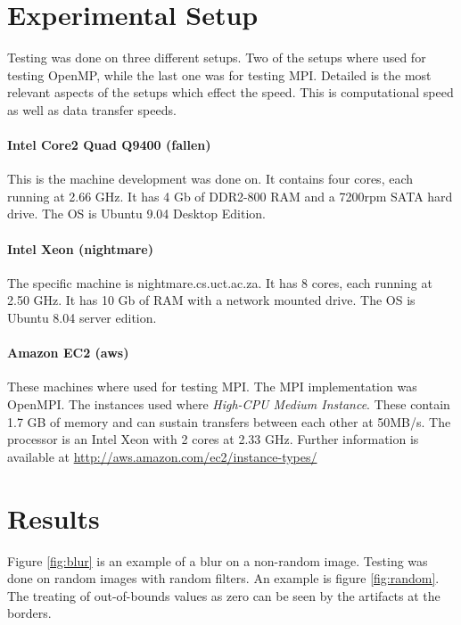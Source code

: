 \documentclass{article}
\begin{document}
\section{Experimental Setup}

Testing was done on three different setups. Two of the setups where used for
testing OpenMP, while the last one was for testing MPI. Detailed is the most
relevant aspects of the setups which effect the speed. This is computational
speed as well as data transfer speeds.

\paragraph{Intel Core2 Quad Q9400 (fallen)}
This is the machine development was done on. It contains four cores, each
running at 2.66 GHz. It has 4 Gb of DDR2-800 RAM and a 7200rpm SATA hard
drive. The OS is Ubuntu 9.04 Desktop Edition.

\paragraph{Intel Xeon (nightmare)}
The specific machine is nightmare.cs.uct.ac.za. It has 8 cores, each running
at 2.50 GHz. It has 10 Gb of RAM with a network mounted drive. The OS is
Ubuntu 8.04 server edition.

\paragraph{Amazon EC2 (aws)}
These machines where used for testing MPI. The MPI implementation was
OpenMPI. The instances used where \emph{High-CPU Medium Instance}. These
contain 1.7 GB of memory and can sustain transfers between each other at
50MB/s. The processor is an Intel Xeon with 2 cores at 2.33 GHz. Further
information is available at \url{http://aws.amazon.com/ec2/instance-types/}

\section{Results}

Figure \ref{fig:blur} is an example of a blur on a non-random image. Testing
was done on random images with random filters. An example is figure
\ref{fig:random}. The treating of out-of-bounds values as zero can be seen by
the artifacts at the borders.
\end{document}
